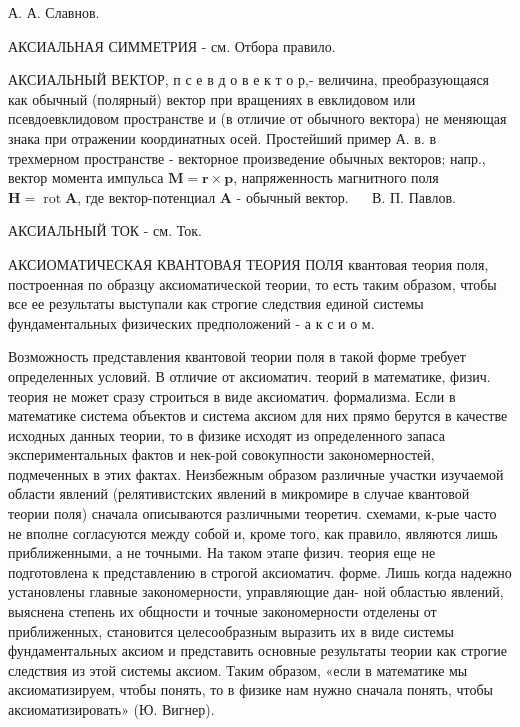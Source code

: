 \documentclass[10pt]{article}
\begin{document}
А. А. Славнов.



АКСИАЛЬНАЯ СИММЕТРИЯ - см. Отбора правило.



АКСИАЛЬНЫЙ ВЕКТОР, п с е в д о в е к т о р,- величина, преобразующаяся как обычный (полярный) вектор при вращениях в евклидовом или псевдоевклидовом пространстве и (в отличие от обычного вектора) не меняющая знака при отражении координатных осей. Простейший пример А. в. в трехмерном пространстве - векторное произведение обычных векторов; напр., вектор момента импульса $\boldsymbol{M}=\boldsymbol{r} \times \boldsymbol{p}$, напряженность магнитного поля $\boldsymbol{H}=\operatorname{rot} \boldsymbol{A}$, где вектор-потенциал $\boldsymbol{A}$ - обычный вектор. $\quad$ В. П. Павлов.



АКСИАЛЬНЫЙ ТОК - см. Ток.



АКСИОМАТИЧЕСКАЯ КВАНТОВАЯ ТЕОРИЯ ПОЛЯ квантовая теория поля, построенная по образцу аксиоматической теории, то есть таким образом, чтобы все ее результаты выступали как строгие следствия единой системы фундаментальных физических предположений - а к с и о м.



Возможность представления квантовой теории поля в такой форме требует определенных условий. В отличие от аксиоматич. теорий в математике, физич. теория не может сразу строиться в виде аксиоматич. формализма. Если в математике система объектов и система аксиом для них прямо берутся в качестве исходных данных теории, то в физике исходят из определенного запаса экспериментальных фактов и нек-рой совокупности закономерностей, подмеченных в этих фактах. Неизбежным образом различные участки изучаемой области явлений (релятивистских явлений в микромире в случае квантовой теории поля) сначала описываются различными теоретич. схемами, к-рые часто не вполне согласуются между собой и, кроме того, как правило, являются лишь приближенными, а не точными. На таком этапе физич. теория еще не подготовлена к представлению в строгой аксиоматич. форме. Лишь когда надежно установлены главные закономерности, управляющие дан- ной областью явлений, выяснена степень их общности и точные закономерности отделены от приближенных, становится целесообразным выразить их в виде системы фундаментальных аксиом и представить основные результаты теории как строгие следствия из этой системы аксиом. Таким образом, «если в математике мы аксиоматизируем, чтобы понять, то в физике нам нужно сначала понять, чтобы аксиоматизировать» (Ю. Вигнер).
\end{document}
